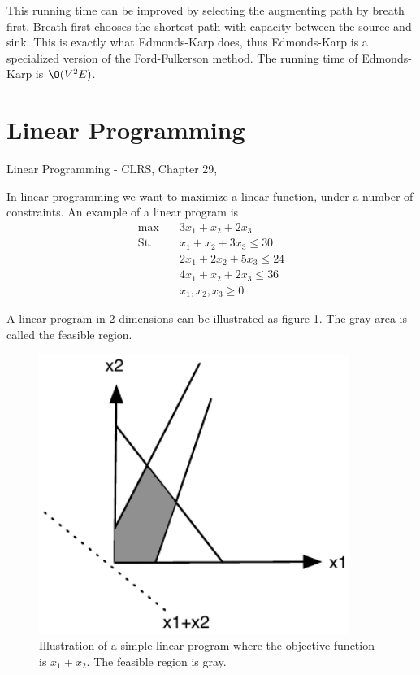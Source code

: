 \documentclass[10pt]{article}
\begin{document}
This running time can be improved by selecting the augmenting path by breath first. Breath first chooses the shortest path with capacity between the source and sink. This is exactly what Edmonds-Karp does, thus Edmonds-Karp is a specialized version of the Ford-Fulkerson method. The running time of Edmonds-Karp is $\O(V^2E)$.




\section{Linear Programming} %
\label{sec:linear_programming}
Linear Programming - CLRS,  Chapter 29,

In linear programming we want to maximize a linear function, under a number of constraints. An example of a linear program is
\begin{align*}
 \max &\quad 3x_1 + x_2 +2x_3  \\ 
 \text{St.} &\quad  x_1 + x_2 + 3x_3  \leq 30 \\
            &\quad  2x_1 + 2x_2 + 5x_3 \leq 24 \\
            &\quad  4x_1 + x_2 + 2x_3 \leq 36 \\            
            &\quad  x_1,x_2,x_3 \geq 0
\end{align*}

A linear program in 2 dimensions can be illustrated as figure \ref{fig3}. The gray area is called the feasible region.
\begin{figure}[ht]
\centering
\includegraphics[width=0.9\textwidth]{figures/fig3.pdf}
\caption{Illustration of a simple linear program where the objective function is $x_1 + x_2$. The feasible region is gray.}
\label{fig3}
\end{figure}
\end{document}
